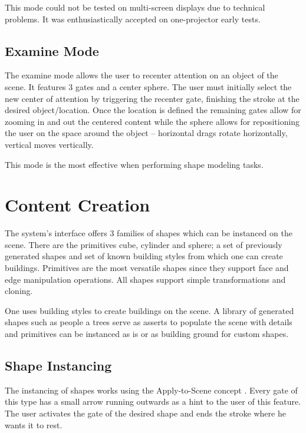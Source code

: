 This mode could not be tested on multi-screen displays due to technical problems. It was enthusiastically accepted on
one-projector early tests.



\subsection{Examine Mode}

The examine mode allows the user to recenter attention on an object of the scene.
It features 3 gates and a center sphere.
The user must initially select the new center of attention by triggering the recenter gate,
finishing the stroke at the desired object/location.
Once the location is defined the remaining gates allow for zooming in and out the centered content
while the sphere allows for repositioning the user on the space around the object -- 
horizontal drags rotate horizontally, vertical moves vertically.

This mode is the most effective when performing shape modeling tasks.



\section{Content Creation}

The system's interface offers 3 families of shapes which can be instanced on the scene.
There are the primitives cube, cylinder and sphere; a set of previously generated shapes
and set of known building styles from which one can create buildings.
Primitives are the most versatile shapes since they support face and edge manipulation operations.
All shapes support simple transformations and cloning.

One uses building styles to create buildings on the scene. A library of generated shapes such as
people a trees serve as asserts to populate the scene with details and primitives can be instanced
as is or as building ground for custom shapes.



\subsection{Shape Instancing}

The instancing of shapes works using the Apply-to-Scene concept .
Every gate of this type has a small arrow running outwards as a hint to the user of this feature.
The user activates the gate of the desired shape and ends the stroke where he wants it to rest.

